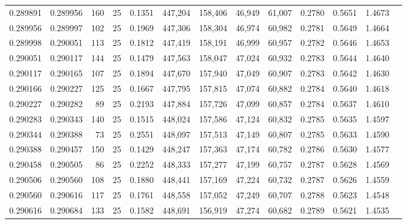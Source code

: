 \begin{tabular}{rrrrrrrrrrrrr}
0.289891 & 0.289956 &   160 &  25 &                                     0.1351 & 447,204 & 158,406 &  46,949 &  61,007 & 0.2780 & 0.5651 & 1.4673 \\
0.289956 & 0.289997 &   102 &  25 &                                     0.1969 & 447,306 & 158,304 &  46,974 &  60,982 & 0.2781 & 0.5649 & 1.4664 \\
0.289998 & 0.290051 &   113 &  25 &                                     0.1812 & 447,419 & 158,191 &  46,999 &  60,957 & 0.2782 & 0.5646 & 1.4653 \\
0.290051 & 0.290117 &   144 &  25 &                                     0.1479 & 447,563 & 158,047 &  47,024 &  60,932 & 0.2783 & 0.5644 & 1.4640 \\
0.290117 & 0.290165 &   107 &  25 &                                     0.1894 & 447,670 & 157,940 &  47,049 &  60,907 & 0.2783 & 0.5642 & 1.4630 \\
0.290166 & 0.290227 &   125 &  25 &                                     0.1667 & 447,795 & 157,815 &  47,074 &  60,882 & 0.2784 & 0.5640 & 1.4618 \\
0.290227 & 0.290282 &    89 &  25 &                                     0.2193 & 447,884 & 157,726 &  47,099 &  60,857 & 0.2784 & 0.5637 & 1.4610 \\
0.290283 & 0.290343 &   140 &  25 &                                     0.1515 & 448,024 & 157,586 &  47,124 &  60,832 & 0.2785 & 0.5635 & 1.4597 \\
0.290344 & 0.290388 &    73 &  25 &                                     0.2551 & 448,097 & 157,513 &  47,149 &  60,807 & 0.2785 & 0.5633 & 1.4590 \\
0.290388 & 0.290457 &   150 &  25 &                                     0.1429 & 448,247 & 157,363 &  47,174 &  60,782 & 0.2786 & 0.5630 & 1.4577 \\
0.290458 & 0.290505 &    86 &  25 &                                     0.2252 & 448,333 & 157,277 &  47,199 &  60,757 & 0.2787 & 0.5628 & 1.4569 \\
0.290506 & 0.290560 &   108 &  25 &                                     0.1880 & 448,441 & 157,169 &  47,224 &  60,732 & 0.2787 & 0.5626 & 1.4559 \\
0.290560 & 0.290616 &   117 &  25 &                                     0.1761 & 448,558 & 157,052 &  47,249 &  60,707 & 0.2788 & 0.5623 & 1.4548 \\
0.290616 & 0.290684 &   133 &  25 &                                     0.1582 & 448,691 & 156,919 &  47,274 &  60,682 & 0.2789 & 0.5621 & 1.4535 \\

\end{tabular}
